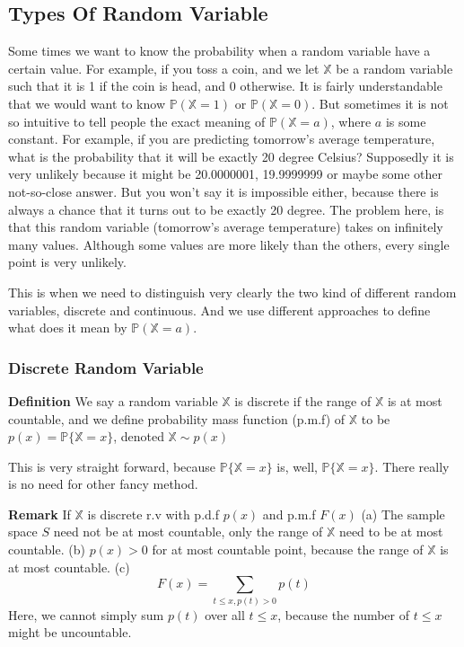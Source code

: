 \documentclass[a4paper,12pt]{article}
\begin{document}
\subsection{Types Of Random Variable}
Some times we want to know the probability when a random variable have a certain value. For example, if you toss a coin, and we let $\mathbb{X}$ be a random variable such that it is 1 if the coin is head, and 0 otherwise. It is fairly understandable that we would want to know $\mathbb{P}(\mathbb{X} = 1)$ or $\mathbb{P}(\mathbb{X} = 0)$. But sometimes it is not so intuitive to tell people the exact meaning of $\mathbb{P}(\mathbb{X} = a)$, where $a$ is some constant. For example, if you are predicting tomorrow's average temperature, what is the probability that it will be exactly 20 degree Celsius? Supposedly it is very unlikely because it might be 20.0000001, 19.9999999 or 
maybe some other not-so-close answer. But you won't say it is impossible either, because there is always a chance that it turns out to be exactly 20 degree. The problem here, is that this random variable (tomorrow's average temperature) takes on infinitely many values. Although some values are more likely than the others, every single point is very unlikely. 

This is when we need to distinguish very clearly the two kind of different random variables, discrete and continuous. And we use different approaches to define what does it mean by $\mathbb{P}(\mathbb{X} = a)$.

\subsubsection{Discrete Random Variable}
\textbf{Definition}
We say a random variable $\mathbb{X}$ is discrete if the range of $\mathbb{X}$ is at most countable, and we define probability mass function (p.m.f) of $\mathbb{X}$ to be
$p(x) = \mathbb{P}\{\mathbb{X}=x\}$, denoted $\mathbb{X} \sim p(x)$

This is very straight forward, because $\mathbb{P}\{\mathbb{X}=x\}$ is, well, $\mathbb{P}\{\mathbb{X}=x\}$. There really is no need for other fancy method. 

\textbf{Remark}
If $\mathbb{X}$ is discrete r.v with p.d.f $p(x)$ and p.m.f $F(x)$ 
(a) The sample space $S$ need not be at most countable, only the range of $\mathbb{X}$ need to be at most countable. 
(b) $p(x) > 0$ for at most countable point, because the range of $\mathbb{X}$ is at most countable. 
(c) $$F(x) = \sum_{t\leq x, p(t)>0}p(t)$$
Here, we cannot simply sum $p(t)$ over all $t\leq x$, because the number of $t\leq x$ might be uncountable.
\end{document}
